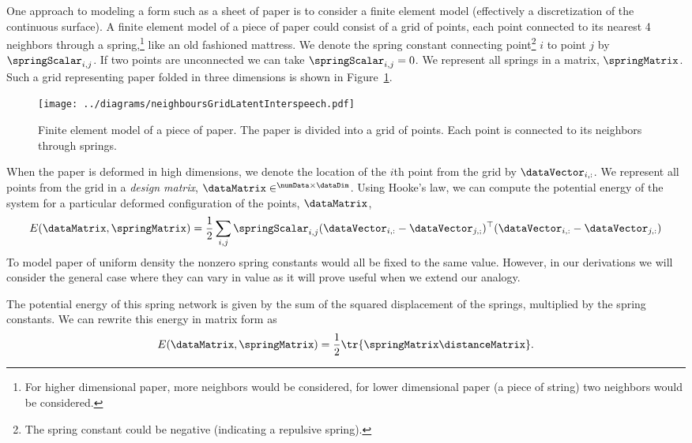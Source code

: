 One  approach to  modeling  a form  such as  a  sheet of  paper is  to
consider a  finite element model (effectively a  discretization of the
continuous surface). A finite element  model of a piece of paper could
consist of  a grid of  points, each point  connected to its  nearest 4
neighbors  through a  spring,\footnote{For  higher dimensional  paper,
  more neighbors  would be considered, for lower  dimensional paper (a
  piece of  string) two  neighbors would be  considered.} like  an old
fashioned   mattress.  We  denote   the  spring   constant  connecting
point\footnote{The  spring constant  could be  negative  (indicating a
  repulsive spring).}   $i$ to point $j$  by $\springScalar_{i,j}$. If
two  points are  unconnected we  can take  $\springScalar_{i,j}=0$. We
represent  all  springs in  a  matrix,  $\springMatrix$.  Such a  grid
representing   paper  folded   in   three  dimensions   is  shown   in
Figure~\ref{fig:neighboursGridData}.
\begin{figure}
  \begin{center}
  \texttt{[image: ../diagrams/neighboursGridLatentInterspeech.pdf]}
  \end{center}
  \caption{Finite element model of a piece of paper. The paper is
    divided into a grid of points. Each point is connected to its
    neighbors through springs.}\label{fig:neighboursGridData}
\end{figure}

When the paper is deformed  in high dimensions, we denote the location
of the $i$th point from the grid by $\dataVector_{i, :}$. We represent
all   points    from   the    grid   in   a    \emph{design   matrix},
$\dataMatrix\in^{\numData\times\dataDim}$.  Using Hooke's law,  we can
compute the potential  energy of the system for  a particular deformed
configuration of the points, $\dataMatrix$,
\[
E(\dataMatrix, \springMatrix) = \frac{1}{2}\sum_{i,j}
\springScalar_{i,j}(\dataVector_{i,:} -
\dataVector_{j,;})^\top(\dataVector_{i,:} - \dataVector_{j,:})
\]
To model paper  of uniform density the nonzero  spring constants would
all be  fixed to the same  value. However, in our  derivations we will
consider the  general case  where they  can vary in  value as  it will
prove useful when we extend our analogy.

The potential energy of this spring network is given by the sum of the
squared  displacement  of  the   springs,  multiplied  by  the  spring
constants. We can rewrite this energy in matrix form as
\[
E(\dataMatrix, \springMatrix) = \frac{1}{2}\tr{\springMatrix \distanceMatrix}.
\]

